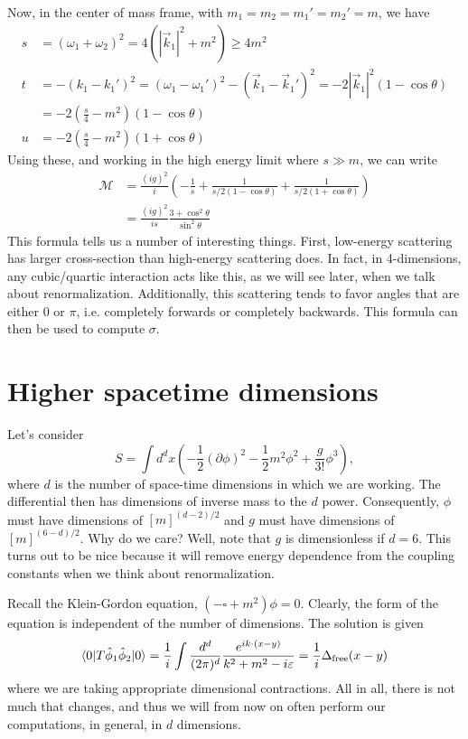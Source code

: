 \documentclass{../mathnotes}
\begin{document}
Now, in the center of mass frame, with $m_1=m_2=m_1'=m_2'=m$, we have
\begin{align*}
    s&=(\omega_1+\omega_2)^2=4(|\vec{k}_1|^2+m^2)\geq 4m^2\\
    t&=-(k_1-k_1')^2=(\omega_1-\omega_1')^2-(\vec{k}_1-\vec{k}_1')^2=-2|\vec{k}_1|^2(1-\cos\theta)\\
    &=-2\left( \frac{s}{4}-m^2 \right)(1-\cos\theta)\\
    u&=-2\left( \frac{s}{4}-m^2 \right)\left( 1+\cos\theta \right)
\end{align*}
Using these, and working in the high energy limit where $s\gg m$, we can write
\begin{align*}
    \mathcal{M}&=\frac{(ig)^2}{i}\left( -\frac{1}{s}+\frac{1}{s/2(1-\cos\theta)}+\frac{1}{s/2(1+\cos\theta)} \right)\\
    &=\frac{(ig)^2}{is}\frac{3+\cos^2\theta}{\sin^2\theta}
\end{align*}
This formula tells us a number of interesting things. First, low-energy scattering has larger cross-section than high-energy scattering does.
In fact, in 4-dimensions, any cubic/quartic interaction acts like this, as we will see later, when we talk about renormalization.
Additionally, this scattering tends to favor angles that are either 0 or $\pi$, i.e. completely forwards or completely backwards. This formula
can then be used to compute $\sigma$.

\section*{Higher spacetime dimensions}

Let's consider
\[S=\int d^dx\left( -\frac{1}{2}(\partial\phi)^2-\frac{1}{2}m^2\phi^2+\frac{g}{3!}\phi^3 \right),\]
where $d$ is the number of space-time dimensions in which we are working. The differential then has dimensions of inverse mass
to the $d$ power. Consequently, $\phi$ must have dimensions of $[m]^{(d-2)/2}$ and $g$ must have dimensions of $[m]^{(6-d)/2}$.
Why do we care? Well, note that $g$ is dimensionless if $d=6$. This turns out to be nice because it will remove energy dependence from
the coupling constants when we think about renormalization.

Recall the Klein-Gordon equation, $(-\square+m^2)\phi=0$. Clearly, the form of the equation is independent of the number of dimensions.
The solution is given
\begin{align*}
    \langle 0 | T\hat\phi_1\hat\phi_2|0\rangle=\frac{1}{i}\int \frac{d^d}{(2\pi)^d}\frac{e^{ik\cdot(x-y)}}{k^2+m^2-i\varepsilon}=\frac{1}{i}\Delta_{\rm free}(x-y)
\end{align*}
where we are taking appropriate dimensional contractions. All in all, there is not much that changes, and thus we will from now on
often perform our computations, in general, in $d$ dimensions.
\end{document}
